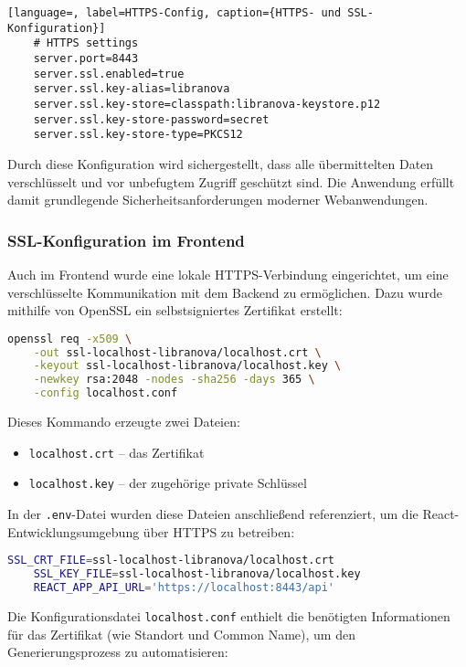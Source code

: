 \begin{lstlisting}[language=, label=HTTPS-Config, caption={HTTPS- und SSL-Konfiguration}]
	# HTTPS settings
	server.port=8443
	server.ssl.enabled=true
	server.ssl.key-alias=libranova
	server.ssl.key-store=classpath:libranova-keystore.p12
	server.ssl.key-store-password=secret
	server.ssl.key-store-type=PKCS12
\end{lstlisting}
Durch diese Konfiguration wird sichergestellt, dass alle übermittelten Daten verschlüsselt und vor unbefugtem Zugriff geschützt sind. Die Anwendung erfüllt damit grundlegende Sicherheitsanforderungen moderner Webanwendungen.


\subsubsection{SSL-Konfiguration im Frontend}

Auch im Frontend wurde eine lokale HTTPS-Verbindung eingerichtet, um eine verschlüsselte Kommunikation mit dem Backend zu ermöglichen. Dazu wurde mithilfe von OpenSSL ein selbstsigniertes Zertifikat erstellt:

\begin{lstlisting}[language=bash, caption={Generierung eines Frontend-Zertifikats}]
	openssl req -x509 \
	-out ssl-localhost-libranova/localhost.crt \
	-keyout ssl-localhost-libranova/localhost.key \
	-newkey rsa:2048 -nodes -sha256 -days 365 \
	-config localhost.conf
\end{lstlisting}
Dieses Kommando erzeugte zwei Dateien:
\begin{itemize}
	\item \texttt{localhost.crt} – das Zertifikat
	\item \texttt{localhost.key} – der zugehörige private Schlüssel
\end{itemize}
In der \texttt{.env}-Datei wurden diese Dateien anschließend referenziert, um die React-Entwicklungsumgebung über HTTPS zu betreiben:

\begin{lstlisting}[language=bash, caption={.env Konfiguration für HTTPS und API-Zugriff}]
	SSL_CRT_FILE=ssl-localhost-libranova/localhost.crt
	SSL_KEY_FILE=ssl-localhost-libranova/localhost.key
	REACT_APP_API_URL='https://localhost:8443/api'
\end{lstlisting}
Die Konfigurationsdatei \texttt{localhost.conf} enthielt die benötigten Informationen für das Zertifikat (wie Standort und Common Name), um den Generierungsprozess zu automatisieren:

